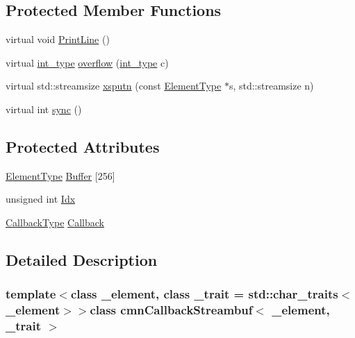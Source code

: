 \subsection*{Protected Member Functions}
\begin{DoxyCompactItemize}
\item 
virtual void \hyperlink{classcmn_callback_streambuf_a6b9c4f2c72d4ad3909959d67c25bfe78}{Print\+Line} ()
\item 
virtual \hyperlink{classcmn_callback_streambuf_a9599d576e1867902844cb4b5bf3150e8}{int\+\_\+type} \hyperlink{classcmn_callback_streambuf_ab06c380ed8bfd927dc4a83b3f3a18a39}{overflow} (\hyperlink{classcmn_callback_streambuf_a9599d576e1867902844cb4b5bf3150e8}{int\+\_\+type} c)
\item 
virtual std\+::streamsize \hyperlink{classcmn_callback_streambuf_ac5b9db0adad90622d6681c085d296b6c}{xsputn} (const \hyperlink{classcmn_callback_streambuf_a3f220172226bbffc7cebefa8d458823a}{Element\+Type} $\ast$s, std\+::streamsize n)
\item 
virtual int \hyperlink{classcmn_callback_streambuf_a8a8beb77b32c7f2856092e656632ac7c}{sync} ()
\end{DoxyCompactItemize}
\subsection*{Protected Attributes}
\begin{DoxyCompactItemize}
\item 
\hyperlink{classcmn_callback_streambuf_a3f220172226bbffc7cebefa8d458823a}{Element\+Type} \hyperlink{classcmn_callback_streambuf_ace8ce96c1695f3122b14be13b2129383}{Buffer} \mbox{[}256\mbox{]}
\item 
unsigned int \hyperlink{classcmn_callback_streambuf_a27d747a886699be88098955251af1159}{Idx}
\item 
\hyperlink{classcmn_callback_streambuf_a606588225b2f37857213d2f3181119dd}{Callback\+Type} \hyperlink{classcmn_callback_streambuf_a8d35b607ee946b5574313a3f3f19be27}{Callback}
\end{DoxyCompactItemize}


\subsection{Detailed Description}
\subsubsection*{template$<$class \+\_\+element, class \+\_\+trait = std\+::char\+\_\+traits$<$\+\_\+element$>$$>$class cmn\+Callback\+Streambuf$<$ \+\_\+element, \+\_\+trait $>$}

